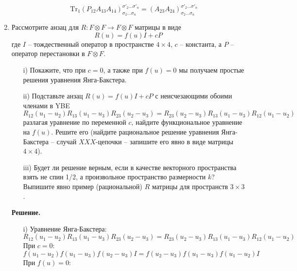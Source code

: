 \documentclass[12pt]{article}
\theoremstyle{definition}
\begin{document}
\begin{enumerate}
\begin{itemize}
\begin{multline}
        \end{multline}
        \begin{equation}
            \boxed{\text{Tr}_1(P_{12}A_{13}A_{14})^{\sigma'_2...\sigma'_n}_{\sigma_2...\sigma_n}=(A_{23}A_{24})^{\sigma'_2...\sigma'_n}_{\sigma_2...\sigma_n}}
        \end{equation}
    \end{itemize}
    \item Рассмотрите анзац для $R:F\otimes F\rightarrow F\otimes F$ матрицы в виде
    \begin{equation}
        R(u)=f(u)I+cP
    \end{equation}
    где $I$ -- тождественный оператор в пространстве $4\times4$, $c$ -- константа, а $P$ -- оператор перестановки в $F\otimes F$.
    \begin{itemize}
        \item[i)] Покажите, что при $c=0$, а также при $f(u)=0$ мы получаем простые решения уравнения Янга-Бакстера.
        \item[ii)] Подставьте анзац $R(u)=f(u)I+cP$ с неисчезающими обоими членами в YBE
        \begin{equation}
            R_{12}(u_1-u_2)R_{13}(u_1-u_3)R_{23}(u_2-u_3)=R_{23}(u_2-u_3)R_{13}(u_1-u_3)R_{12}(u_1-u_2)
        \end{equation}
        разлагая уравнение по переменной $c$, найдите функциональное уравнение на $f(u)$. Решите его (найдите рациональное решение уравнения Янга-Бакстера -- случай $XXX$-цепочки -- запишите его явно в виде матрицы $4\times4$).
        \item[iii)] Будет ли решение верным, если в качестве векторного пространства взять не спин 1/2, а произвольное пространство размерности $k$? Выпишите явно пример (рациональной) $R$ матрицы для пространств $3\times3$. 
    \end{itemize}
    \textbf{Решение.}
    \begin{itemize}
        \item[i)] Уравнение Янга-Бакстера:
        \begin{equation}
            R_{12}(u_1-u_2)R_{13}(u_1-u_3)R_{23}(u_2-u_3)=R_{23}(u_2-u_3)R_{13}(u_1-u_3)R_{12}(u_1-u_2)
        \end{equation}
        При $c=0$:
        \begin{equation}
            f(u_1-u_2)f(u_1-u_3)f(u_2-u_3)I=f(u_2-u_3)f(u_1-u_3)f(u_1-u_2)I
        \end{equation}
        При $f(u)=0$:
        \begin{equation}

\end{equation}
\end{itemize}
\end{enumerate}
\end{document}
